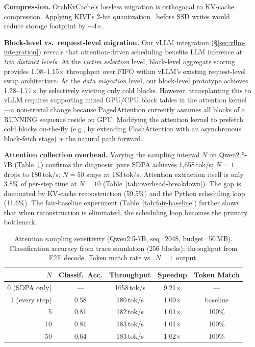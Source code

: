 \documentclass[conference]{IEEEtran}
\begin{document}
\textbf{Compression.} OrchKvCache's lossless migration is orthogonal to KV-cache compression. Applying KIVI's 2-bit quantization~\cite{kivi} before SSD writes would reduce storage footprint by ${\sim}$4$\times$.

\textbf{Block-level vs.\ request-level migration.}
\label{sec:discussion}
Our vLLM integration (\S\ref{sec:vllm-integration}) reveals that attention-driven scheduling benefits LLM inference at \emph{two distinct levels}. At the \emph{victim selection} level, block-level aggregate scoring provides 1.08--1.15$\times$ throughput over FIFO within vLLM's existing request-level swap architecture. At the \emph{data migration} level, our block-level prototype achieves 1.28--1.77$\times$ by selectively evicting only cold blocks. However, transplanting this to vLLM requires supporting mixed GPU/CPU block tables in the attention kernel---a non-trivial change because PagedAttention currently assumes all blocks of a RUNNING sequence reside on GPU. Modifying the attention kernel to prefetch cold blocks on-the-fly (e.g., by extending FlashAttention with an asynchronous block-fetch stage) is the natural path forward.

\textbf{Attention collection overhead.}
Varying the sampling interval $N$ on Qwen2.5-7B (Table~\ref{tab:sampling}) confirms the diagnosis: pure SDPA achieves 1,658\,tok/s; $N{=}1$ drops to 180\,tok/s; $N{=}50$ stays at 183\,tok/s.  Attention extraction itself is only 3.8\% of per-step time at $N{=}10$ (Table~\ref{tab:overhead-breakdown}).  The gap is dominated by KV-cache reconstruction (59.5\%) and the Python scheduling loop (11.6\%).  The fair-baseline experiment (Table~\ref{tab:fair-baseline}) further shows that when reconstruction is eliminated, the scheduling loop becomes the primary bottleneck.

\begin{table}[t]
\centering
\caption{Attention sampling sensitivity (Qwen2.5-7B, seq=2048, budget=50\,MB). Classification accuracy from trace simulation (256 blocks); throughput from E2E decode. Token match rate vs.\ $N{=}1$ output.}
\label{tab:sampling}
\small
\begin{tabular}{@{}rcccc@{}}
\toprule
$N$ & Classif.\ Acc. & Throughput & Speedup & Token Match \\
\midrule
0 (SDPA only) & --- & 1658\,tok/s & 9.21$\times$ & --- \\
1 (every step) & 0.58 & 180\,tok/s & 1.00$\times$ & baseline \\
5 & 0.81 & 182\,tok/s & 1.01$\times$ & 100\% \\
10 & 0.81 & 183\,tok/s & 1.01$\times$ & 100\% \\
50 & 0.64 & 183\,tok/s & 1.02$\times$ & 100\% \\
\bottomrule
\end{tabular}
\end{table}
\end{document}
